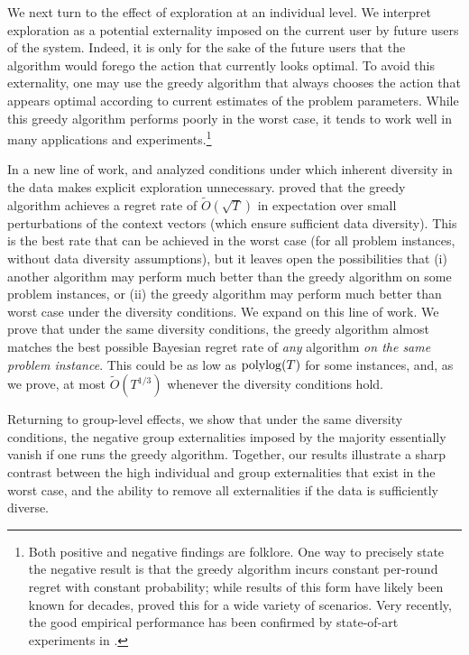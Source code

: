We next turn to the effect of exploration at an individual level. We interpret exploration as a potential externality imposed on the current user by future users of the system. Indeed, it is only for the sake of the future users that the algorithm would forego the action that currently looks optimal. To avoid this externality, one may use the greedy algorithm that always chooses the action that appears optimal according to current estimates of the problem parameters. While this greedy algorithm performs poorly in the worst case,
it tends to work well in many applications and experiments.\footnote{Both positive and negative findings are folklore. One way to precisely state the negative result is that the greedy algorithm incurs constant per-round regret with constant probability; while results of this form have likely been known for decades,
\citet[Corollary A.2(b)]{competingBandits-itcs16}
proved this for a wide variety of scenarios. Very recently, the good empirical performance has been confirmed by state-of-art experiments in \citet{practicalCB-arxiv18}.}

In a new line of work, \citet{bastani2017exploiting} and \citet{kannan2018smoothed}
analyzed conditions under which inherent diversity in the data makes explicit exploration unnecessary.
\citet{kannan2018smoothed} proved that the greedy algorithm achieves a regret rate of
$\tilde{O}(\sqrt{T})$ in expectation over small perturbations of the context vectors (which ensure sufficient data diversity). This is the best rate that can be achieved in the worst case (\ie for all problem instances, without data diversity assumptions), but it leaves open the possibilities that (i) another algorithm may perform much better than the greedy algorithm on some problem instances, or (ii) the greedy algorithm may perform much better than worst case under the diversity conditions. We expand on this line of work. We prove that under the same diversity conditions, the greedy algorithm almost matches the best possible Bayesian regret rate of \emph{any} algorithm \emph{on the same problem instance}. This could be as low as $\polylog(T)$ for some instances, and, as we prove, at most $\tilde{O}(T^{1/3})$ whenever the diversity conditions hold.


Returning to group-level effects, we show that under the same diversity conditions, the negative group externalities imposed by the majority essentially vanish if one runs the greedy algorithm. Together, our results illustrate a sharp contrast between the high individual and group externalities that exist in the worst case, and the ability to remove all externalities if the data is sufficiently diverse.   

